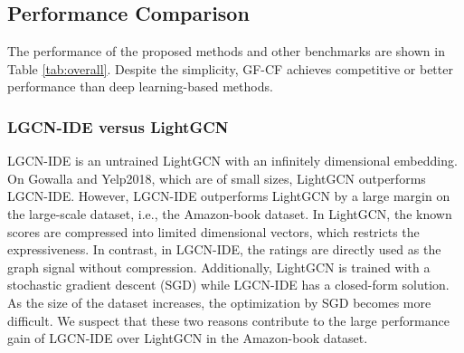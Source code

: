 \documentclass[sigconf]{acmart}
\begin{document}
\begin{table*}[h]
\caption{The comparison of performance and training time of GF-CF and LightGCN.}
\label{tab:time}
\end{table*}

\subsection{Performance Comparison}
The performance of the proposed methods and other benchmarks are shown in Table \ref{tab:overall}. Despite the simplicity, GF-CF achieves competitive or better performance than deep learning-based methods. 


\subsubsection{LGCN-IDE versus LightGCN} LGCN-IDE is an untrained LightGCN with an infinitely dimensional embedding. On Gowalla and Yelp2018, which are of small sizes, LightGCN outperforms LGCN-IDE. However, LGCN-IDE outperforms LightGCN by a large margin on the large-scale dataset, i.e., the Amazon-book dataset. In LightGCN, the known scores are compressed into limited dimensional vectors, which restricts the expressiveness. In contrast, in LGCN-IDE, the ratings are directly used as the graph signal without compression. Additionally, LightGCN is trained with a stochastic gradient descent (SGD) while LGCN-IDE has a closed-form solution. As the size of the dataset increases, the optimization by SGD becomes more difficult. We suspect that these two reasons contribute to the large performance gain of LGCN-IDE over LightGCN in the Amazon-book dataset.
\end{document}
